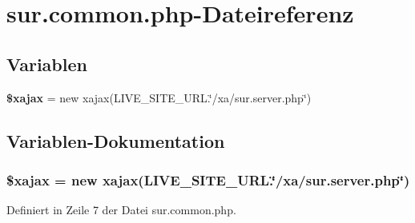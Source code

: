\section{sur.common.php-Dateireferenz}
\label{sur_8common_8php}
\subsection*{Variablen}
\begin{CompactItemize}
\item 
{\bf \$xajax} = new xajax(LIVE\_\-SITE\_\-URL.\char`\"{}/xa/sur.server.php\char`\"{})
\end{CompactItemize}


\subsection{Variablen-Dokumentation}
\subsubsection{\setlength{\rightskip}{0pt plus 5cm}\$xajax = new xajax(LIVE\_\-SITE\_\-URL.\char`\"{}/xa/sur.server.php\char`\"{})}\label{sur_8common_8php_8c81ee15e56ba51f169291a2b1936cb1}




Definiert in Zeile 7 der Datei sur.common.php.